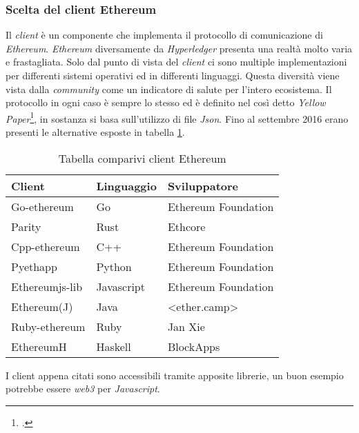 \subsubsection{Scelta del client Ethereum}
Il \emph{client} è un componente che implementa il protocollo di comunicazione di \emph{Ethereum}. \emph{Ethereum} diversamente da \emph{Hyperledger} presenta una realtà molto varia e frastagliata. Solo dal punto di vista del \emph{client} ci sono multiple implementazioni per differenti sistemi operativi ed in differenti linguaggi. Questa diversità viene vista dalla \emph{community} come un indicatore di salute per l’intero ecosistema. Il protocollo in ogni caso è sempre lo stesso ed è definito nel così detto \emph{Yellow Paper}\footcite{site:ethereum-yellow-paper}, in sostanza si basa sull’utilizzo di file \emph{Json}. 
Fino al settembre 2016 erano presenti le alternative esposte in tabella \ref{tab:comp-client}.
\begin{table}[!h] %
    \caption{Tabella comparivi client Ethereum}
    \label{tab:comp-client}
    \begin{tabularx}{\textwidth}{|X|X|X|}
    \hline
    \textbf{Client} & \textbf{Linguaggio} & \textbf{Sviluppatore}\\
    \hline
    Go-ethereum   & Go & Ethereum Foundation \\
    \hline
    Parity   & Rust & Ethcore \\
    \hline
    Cpp-ethereum   & C++ & Ethereum Foundation\\
    \hline
    Pyethapp  & Python & Ethereum Foundation\\
    \hline
    Ethereumjs-lib  & Javascript & Ethereum Foundation\\
    \hline
    Ethereum(J)  & Java & <ether.camp>\\
    \hline
    Ruby-ethereum  & Ruby & Jan Xie\\
    \hline
    EthereumH  & Haskell & BlockApps\\
    \hline
    \end{tabularx}
\end{table}%
I client appena citati sono accessibili tramite apposite librerie, un buon esempio potrebbe essere \emph{web3} per \emph{Javascript}.
